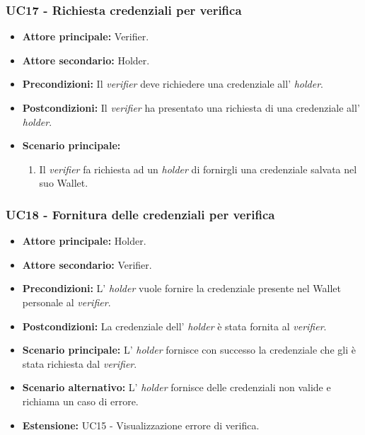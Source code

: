\subsubsection{UC17 - Richiesta credenziali per verifica}
\begin{itemize}
\item \textbf{Attore principale:} Verifier.
\item \textbf{Attore secondario:} Holder.
\item \textbf{Precondizioni:} Il \textit{verifier} deve richiedere una credenziale all' \textit{holder}.
\item \textbf{Postcondizioni:} Il \textit{verifier} ha presentato una richiesta di una credenziale all' \textit{holder}.
\item \textbf{Scenario principale:} 
    \begin{enumerate}
        \item Il \textit{verifier} fa richiesta ad un \textit{holder} di fornirgli una credenziale salvata nel suo Wallet.
    \end{enumerate}
\end{itemize}

\subsubsection{UC18 - Fornitura delle credenziali per verifica}
\begin{itemize}
\item \textbf{Attore principale:} Holder. 
\item \textbf{Attore secondario:} Verifier.
\item \textbf{Precondizioni:} L’ \textit{holder} vuole fornire la credenziale presente nel Wallet personale al \textit{verifier}.
\item \textbf{Postcondizioni:} La credenziale dell’ \textit{holder} è stata fornita al \textit{verifier}.
\item \textbf{Scenario principale:} L' \textit{holder} fornisce con successo la credenziale che gli è stata richiesta dal \textit{verifier}.
\item \textbf{Scenario alternativo:} L' \textit{holder} fornisce delle credenziali non valide e richiama un caso di errore.
\item \textbf{Estensione:} UC15 - Visualizzazione errore di verifica.
\end{itemize}

